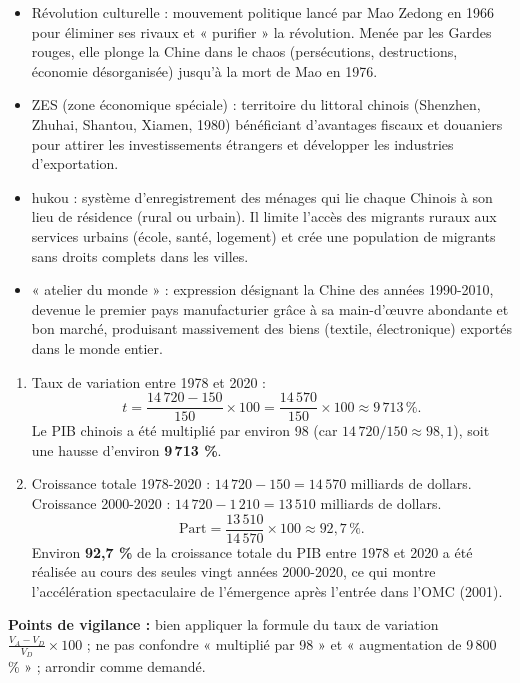 \documentclass[11pt]{article}
\newcommand{\cle}[1]{{\popxbold\color{popdark}#1}}
\begin{document}
\begin{corrige}
\begin{itemize}
\item \cle{Révolution culturelle} : mouvement politique lancé par Mao Zedong en 1966 pour éliminer ses rivaux et « purifier » la révolution. Menée par les Gardes rouges, elle plonge la Chine dans le chaos (persécutions, destructions, économie désorganisée) jusqu'à la mort de Mao en 1976.
\item \cle{ZES} (zone économique spéciale) : territoire du littoral chinois (Shenzhen, Zhuhai, Shantou, Xiamen, 1980) bénéficiant d'avantages fiscaux et douaniers pour attirer les investissements étrangers et développer les industries d'exportation.
\item \cle{hukou} : système d'enregistrement des ménages qui lie chaque Chinois à son lieu de résidence (rural ou urbain). Il limite l'accès des migrants ruraux aux services urbains (école, santé, logement) et crée une population de migrants sans droits complets dans les villes.
\item \cle{« atelier du monde »} : expression désignant la Chine des années 1990-2010, devenue le premier pays manufacturier grâce à sa main-d'œuvre abondante et bon marché, produisant massivement des biens (textile, électronique) exportés dans le monde entier.
\end{itemize}
\end{corrige}

\begin{corrige}
\begin{enumerate}
\item Taux de variation entre 1978 et 2020 :
\[ t = \frac{14\,720 - 150}{150} \times 100 = \frac{14\,570}{150} \times 100 \approx 9\,713\,\%. \]
Le PIB chinois a été multiplié par environ 98 (car $14\,720 / 150 \approx 98,1$), soit une hausse d'environ \textbf{9\,713 \%}.
\item Croissance totale 1978-2020 : $14\,720 - 150 = 14\,570$ milliards de dollars. Croissance 2000-2020 : $14\,720 - 1\,210 = 13\,510$ milliards de dollars.
\[ \text{Part} = \frac{13\,510}{14\,570} \times 100 \approx 92,7\,\%. \]
Environ \textbf{92,7 \%} de la croissance totale du PIB entre 1978 et 2020 a été réalisée au cours des seules vingt années 2000-2020, ce qui montre l'accélération spectaculaire de l'émergence après l'entrée dans l'OMC (2001).
\end{enumerate}
\textbf{Points de vigilance :} bien appliquer la formule du taux de variation $\frac{V_A - V_D}{V_D} \times 100$ ; ne pas confondre « multiplié par 98 » et « augmentation de 9\,800 \% » ; arrondir comme demandé.
\end{corrige}
\end{document}
